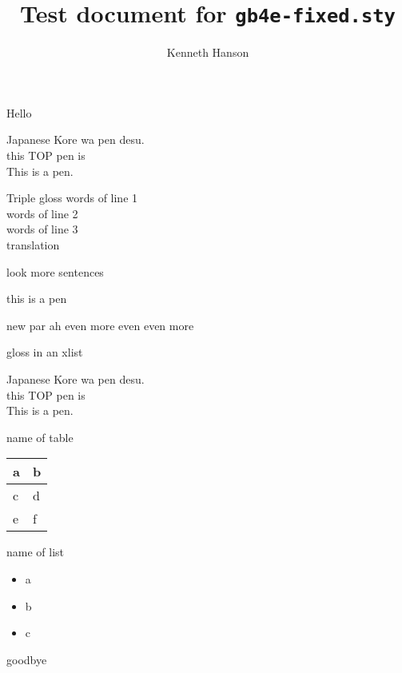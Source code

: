 \documentclass{article}
\title{Test document for \texttt{gb4e-fixed.sty}}
\author{Kenneth Hanson}
\begin{document}
\maketitle

Hello

\begin{exe}
    \ex Japanese
    \gll Kore wa pen desu.\\
        this TOP pen is\\
    \glt This is a pen.

    \ex Triple gloss
    \glll words of line 1\\
        words of line 2\\
        words of line 3\\
    \glt translation

    \ex look more sentences
        \begin{xlist}
        \ex this is a pen\par
            new par
        \ex ah even more
        \ex even even more
        \end{xlist}

    \ex gloss in an xlist
        \begin{xlist}
        \ex Japanese
        \gll Kore wa pen desu.\\
            this TOP pen is\\
        \glt This is a pen.
        \end{xlist}

    \ex name of table\par
        \begin{flushleft}
        \begin{tabular}{ll}
        \hline
        a & b \\\hline
        c & d \\
        e & f \\
        \hline
        \end{tabular}
        \end{flushleft}

    \ex name of list
        \begin{itemize}
        \item a
        \item b
        \item c
        \end{itemize}
\end{exe}

goodbye
\end{document}
